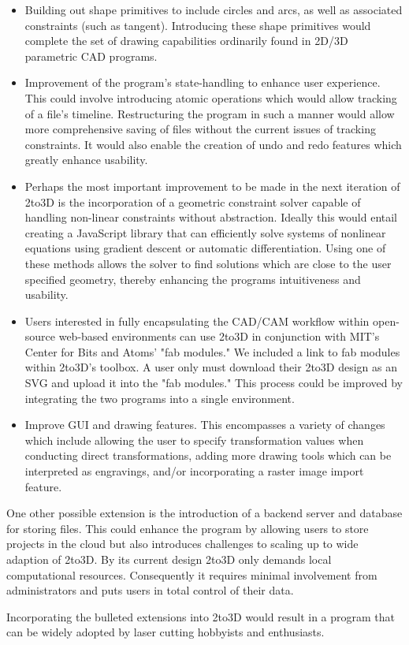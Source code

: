 \begin{itemize}
  \item Building out shape primitives to include circles and arcs, as well as associated constraints (such as tangent). Introducing these shape primitives would complete the set of drawing capabilities ordinarily found in 2D/3D parametric CAD programs.

  \item Improvement of the program's state-handling to enhance user experience. This could involve introducing atomic operations which would allow tracking of a file's timeline. Restructuring the program in such a manner would allow more comprehensive saving of files without the current issues of tracking constraints. It would also enable the creation of undo and redo features which greatly enhance usability.

  \item Perhaps the most important improvement to be made in the next iteration of 2to3D is the incorporation of a geometric constraint solver capable of handling non-linear constraints without abstraction. Ideally this would entail creating a JavaScript library that can efficiently solve systems of nonlinear equations using gradient descent or automatic differentiation. Using one of these methods allows the solver to find solutions which are close to the user specified geometry, thereby enhancing the programs intuitiveness and usability.

  \item Users interested in fully encapsulating the CAD/CAM workflow within open-source web-based environments can use 2to3D in conjunction with MIT's Center for Bits and Atoms' "fab modules." We included a link to fab modules within 2to3D's toolbox. A user only must download their 2to3D design as an SVG and upload it into the "fab modules." This process could be improved by integrating the two programs into a single environment.
  
  \item Improve GUI and drawing features. This encompasses a variety of changes which include allowing the user to specify transformation values when conducting direct transformations, adding more drawing tools which can be interpreted as engravings, and/or incorporating a raster image import feature.
\end{itemize}

One other possible extension is the introduction of a backend server and database for storing files. This could enhance the program by allowing users to store projects in the cloud but also introduces challenges to scaling up to wide adaption of 2to3D. By its current design 2to3D only demands local computational resources. Consequently it requires minimal involvement from administrators and puts users in total control of their data. 

Incorporating the bulleted extensions into 2to3D would result in a program that can be widely adopted by laser cutting hobbyists and enthusiasts.


